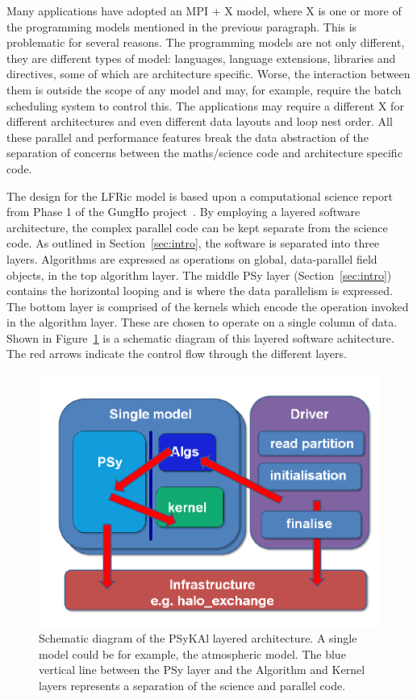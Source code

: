 \documentclass[review,times]{elsarticle}
\begin{document}
Many applications have adopted an MPI + X model, where X is one or
more of the programming models mentioned in the previous paragraph. This
is problematic for several reasons. The programming models are not
only different, they are different types of model: languages, language
extensions, libraries and directives, some of which are architecture
specific. Worse, the interaction between them is outside the scope of
any model and may, for example, require the batch scheduling
system to control this. The applications may require a different X for
different architectures and even different data layouts and
loop nest order. All these parallel and performance features
break the data abstraction of the separation of concerns between the
maths/science code and architecture specific code.

The design for the LFRic model is based upon a computational science
report from Phase 1 of the GungHo project~\cite{GHP1_CSR}. By
employing a layered software architecture, the complex parallel code
can be kept separate from the science code. As outlined in 
Section~\ref{sec:intro}, the software is separated into three layers.
Algorithms are expressed as operations on global, data-parallel field objects,
in the top algorithm layer. The middle PSy layer (Section~\ref{sec:intro}) 
contains the horizontal looping and is where the data parallelism is expressed. 
The bottom layer is comprised of the kernels which encode the operation invoked in the
algorithm layer. These are chosen to operate on a single column of data. 
Shown in Figure~\ref{fig:psykal} is a schematic diagram of this
layered software achitecture. The red arrows indicate the control flow
through the different layers. 

\begin{figure}
\centering\includegraphics[width=0.8\linewidth]{Fig3_PSyKAl.pdf}
\caption{\label{fig:psykal} Schematic diagram of the PSyKAl layered
  architecture. A single model could be for example, the atmospheric
  model. The blue vertical line between the PSy layer and the
  Algorithm and Kernel layers represents a separation of the science
  and parallel code.}
\end{figure}
\end{document}
